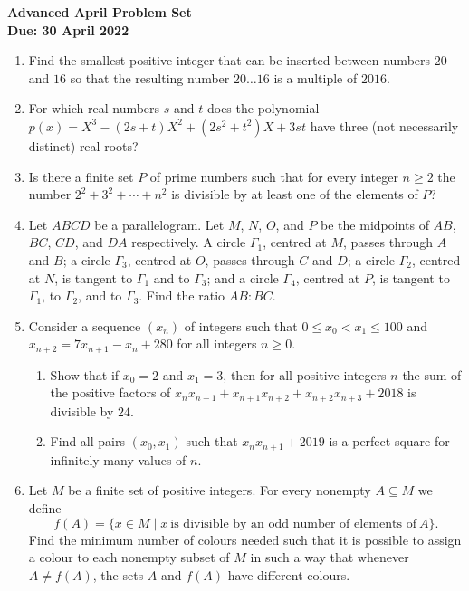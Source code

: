 \documentclass{article}
\begin{document}
\thispagestyle{empty}

\begin{center}
  \textbf{\Large Advanced April Problem Set}
  \\ \vspace{1em}
  \textbf{\large Due: 30 April 2022}
\end{center}

\bigskip

\begin{enumerate}[itemsep=12pt]

\item %
Find the smallest positive integer that can be inserted between numbers $20$ and $16$ so that the resulting number $20 \dots 16$ is a multiple of $2016$.


\item %
For which real numbers $s$ and $t$ does the polynomial $p(x) = X^3 -(2s+t)X^2 +(2s^2+t^2)X +3st$ have three (not necessarily distinct) real roots?


\item %
Is there a finite set $P$ of prime numbers such that for every integer $n \geq 2$ the number $2^2 +3^2 +\dotsb +n^2$ is divisible by at least one of the elements of $P$?


\item %
Let $ABCD$ be a parallelogram.
Let $M$, $N$, $O$, and $P$ be the midpoints of $AB$, $BC$, $CD$, and $DA$ respectively.
A circle $\Gamma_1$, centred at $M$, passes through $A$ and $B$; a circle $\Gamma_3$, centred at $O$, passes through $C$ and $D$; a circle $\Gamma_2$, centred at $N$, is tangent to $\Gamma_1$ and to $\Gamma_3$; and a circle $\Gamma_4$, centred at $P$, is tangent to $\Gamma_1$, to $\Gamma_2$, and to $\Gamma_3$.
Find the ratio $AB:BC$.


\item %
Consider a sequence $(x_n)$ of integers such that $0 \leq x_0 < x_1 \leq 100$ and $x_{n+2} = 7x_{n+1} -x_n +280$ for all integers $n \geq 0$.
\begin{enumerate}
	\item Show that if $x_0 = 2$ and $x_1 = 3$, then for all positive integers $n$ the sum of the positive factors of $x_n x_{n+1} +x_{n+1}x_{n+2} +x_{n+2}x_{n+3} +2018$ is divisible by $24$.
	\item Find all pairs $(x_0,x_1)$ such that $x_n x_{n+1} +2019$ is a perfect square for infinitely many values of $n$.
\end{enumerate}


\item %
Let $M$ be a finite set of positive integers.
For every nonempty $A \subseteq M$ we define
\[ f(A) = \{x \in M \mid x \ \text{is divisible by an odd number of elements of} \ A\}. \]
Find the minimum number of colours needed such that it is possible to assign a colour to each nonempty subset of $M$ in such a way that whenever $A \neq f(A)$, the sets $A$ and $f(A)$ have different colours.

\end{enumerate}
\end{document}
